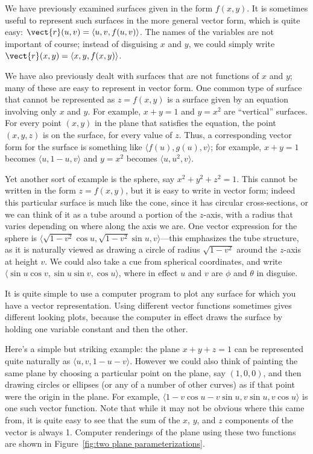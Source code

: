 We have previously examined surfaces given in the form 
$f(x,y)$. It is sometimes useful to represent such surfaces in the
more general vector form, which is quite easy:
$\vect{r}(u,v)=\langle u,v,f(u,v)\rangle$. The names of the variables
are not important of course; instead of disguising $x$ and $y$, we
could simply write $\vect{r}(x,y)=\langle x,y,f(x,y)\rangle$. 

We have also previously dealt with surfaces that are not functions of
$x$ and $y$; many of these are easy to represent in vector form.
One common type of surface that cannot be represented as $z=f(x,y)$ is
a surface given by an equation involving only $x$ and $y$. For
example,
$x+y=1$ and $y=x^2$ are ``vertical'' surfaces. For every point $(x,y)$
in the plane that satisfies the equation, the point $(x,y,z)$ is on
the surface, for 
every value of $z$. Thus, a corresponding vector form for the surface
is something like $\langle f(u),g(u),v\rangle$; for example, $x+y=1$
becomes $\langle u,1-u,v\rangle$ and $y=x^2$ becomes $\langle
u,u^2,v\rangle$. 

Yet another sort of example is the sphere, say $x^2+y^2+z^2=1$. This
cannot be written in the form $z=f(x,y)$, but it is easy to write in
vector form; indeed this particular surface is much like the cone,
since it has circular cross-sections, or we can think of it as a tube
around a portion of the $z$-axis, with a radius that varies depending
on where along the axis we are. One vector expression for the sphere
is $\langle \sqrt{1-v^2}\cos u,\sqrt{1-v^2}\sin u, v\rangle$---this
emphasizes the tube structure, as it is naturally viewed as drawing a
circle of radius $\sqrt{1-v^2}$ around the $z$-axis at height $v$.
We could also take a cue from spherical coordinates, and write
$\langle \sin u\cos v,\sin u\sin v,\cos u\rangle$, where in effect
$u$ and $v$ are $\phi$ and $\theta$ in disguise. 

It is quite simple to use a computer program to plot any surface for which you have a
vector representation. Using different vector functions sometimes
gives different looking plots, because the computer in effect draws the
surface by holding one variable constant and then the other. 

Here's a simple but striking example: the plane $x+y+z=1$ can be
represented quite naturally as $\langle u,v,1-u-v\rangle$. However we
could also think of painting the same plane by choosing a particular
point on the plane, say $(1,0,0)$, and then drawing circles or
ellipses (or any of a number of other curves) as if that point were
the origin in the plane. For example, $\langle 1-v\cos u-v\sin u,v\sin
u,v\cos u\rangle$ is one such vector function. Note that while it may
not be obvious where this came from, it is quite easy to see that
the sum of the $x$, $y$, and $z$ components of the vector is always
1. Computer renderings of the plane using these two functions are shown
in Figure~\ref{fig:two plane parameterizations}.

